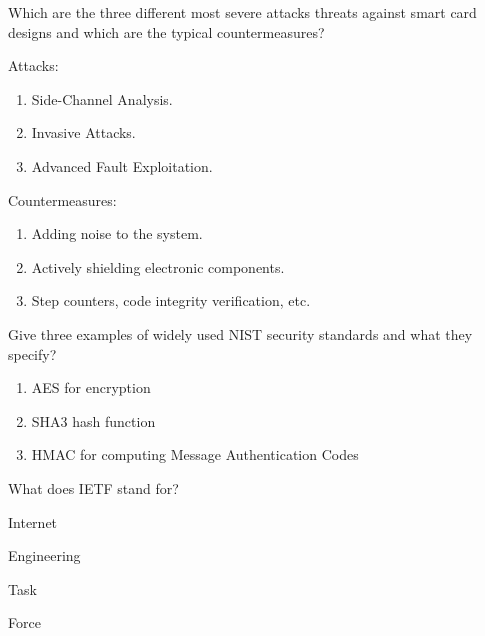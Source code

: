 \begin{questions}
\question{} Which are the three different most severe attacks threats against smart card designs and which are the typical countermeasures?
  \begin{solution}
    Attacks:
    \begin{enumerate}[noitemsep]
    \item Side-Channel Analysis.
    \item Invasive Attacks.
    \item Advanced Fault Exploitation.
    \end{enumerate}

    Countermeasures:
    \begin{enumerate}[noitemsep]
    \item Adding noise to the system.
    \item Actively shielding electronic components.
    \item Step counters, code integrity verification, etc.
    \end{enumerate}
  \end{solution}

\question{} Give three examples of widely used NIST security standards and what they specify?
  \begin{solution}
    \begin{enumerate}[noitemsep]
    \item AES for encryption
    \item SHA3 hash function
    \item HMAC for computing Message Authentication Codes
    \end{enumerate}
  \end{solution}

\question{} What does IETF stand for?
  \begin{solution}
    \begin{description}[noitemsep]
    \item[I] Internet
    \item[E] Engineering
    \item[T] Task
    \item[F] Force
    \end{description}
  \end{solution}

  \begin{parts}

\end{parts}
\end{questions}
